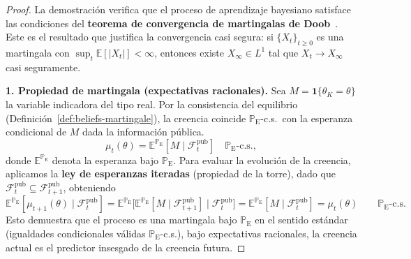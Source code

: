 \documentclass[12pt]{article}
\providecommand{\textcite}{\citet}
\theoremstyle{definition}
\theoremstyle{remark}
\newcommand{\E}{\mathbb{E}}
\newcommand{\ProbE}{\mathbb{P}_{\mathrm{E}}}
\newcommand{\1}{\mathbf{1}}
\begin{document}
\begin{proof}
La demostración verifica que el proceso de aprendizaje bayesiano satisface las condiciones del \textbf{teorema de convergencia de martingalas de Doob}~\textcite{Doob1953Stochastic,Williams1991Martingales,Shiryaev2019Probability}. Este es el resultado que justifica la convergencia casi segura: si $\{X_t\}_{t\ge0}$ es una martingala con $\sup_t\E[\lvert X_t\rvert]<\infty$, entonces existe $X_\infty\in L^1$ tal que $X_t\to X_\infty$ casi seguramente.

\smallskip
\noindent\textbf{1. Propiedad de martingala \textup{(}expectativas racionales\textup{)}.}
Sea $M = \mathbf{1}\{\theta_K = \theta\}$ la variable indicadora del tipo real. Por la consistencia del equilibrio \textup{(}Definición~\ref{def:beliefs-martingale}\textup{)}, la creencia coincide $\ProbE$-c.s.\ con la esperanza condicional de $M$ dada la información pública.
\[
\mu_t(\theta) = \E^{\ProbE}[M \mid \mathcal{F}_t^{\mathrm{pub}}]\quad \ProbE\text{-c.s.},
\]
donde $\E^{\ProbE}$ denota la esperanza bajo $\ProbE$. Para evaluar la evolución de la creencia, aplicamos la \textbf{ley de esperanzas iteradas} \textup{(}propiedad de la torre\textup{)}, dado que $\mathcal{F}_t^{\mathrm{pub}} \subseteq \mathcal{F}_{t+1}^{\mathrm{pub}}$, obteniendo
\begin{equation}
\label{eq:lem74-tower}
\E^{\ProbE}[\mu_{t+1}(\theta) \mid \mathcal{F}_t^{\mathrm{pub}}] = \E^{\ProbE}\bigl[\E^{\ProbE}[M \mid \mathcal{F}_{t+1}^{\mathrm{pub}}] \mid \mathcal{F}_t^{\mathrm{pub}}\bigr] = \E^{\ProbE}[M \mid \mathcal{F}_t^{\mathrm{pub}}] = \mu_t(\theta)\qquad \ProbE\text{-c.s.}
\end{equation}
Esto demuestra que el proceso es una martingala bajo $\ProbE$ en el sentido estándar \textup{(}igualdades condicionales válidas $\ProbE$-c.s.\textup{)}, bajo expectativas racionales, la creencia actual es el predictor insesgado de la creencia futura.


\end{proof}
\end{document}
